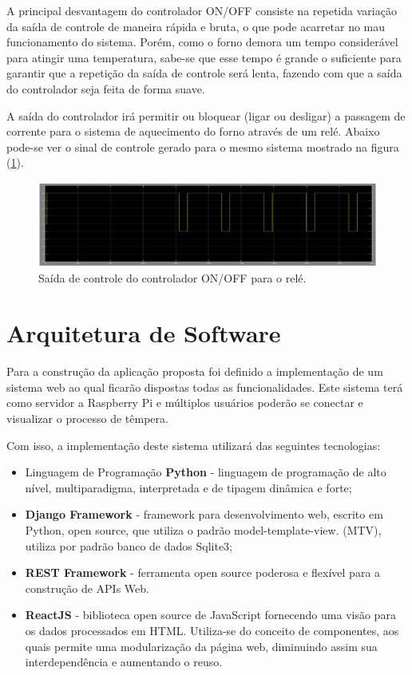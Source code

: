 A principal desvantagem do controlador ON/OFF consiste na repetida variação da saída de controle de maneira rápida e bruta, o que pode acarretar no mau funcionamento do sistema. Porém, como o forno demora um tempo considerável para atingir uma temperatura, sabe-se que esse tempo é grande o suficiente para garantir que a repetição da saída de controle será lenta, fazendo com que a saída do controlador seja feita de forma suave.

A saída do controlador irá permitir ou bloquear (ligar ou desligar) a passagem de corrente para o sistema de aquecimento do forno através de um relé. Abaixo pode-se ver o sinal de controle gerado para o mesmo sistema mostrado na figura (\ref{saida_controle}).

\begin{figure}[h]
	\centering
	\label{saida_controle}
	\includegraphics[keepaspectratio=true,scale=0.8]{figuras/saida_controle.JPG}
	\caption{Saída de controle do controlador ON/OFF para o relé.}
\end{figure}

\section{Arquitetura de Software}

Para a construção da aplicação proposta foi definido a implementação de um sistema web ao qual ficarão dispostas todas as funcionalidades. Este sistema terá como servidor a Raspberry Pi e múltiplos usuários poderão se conectar e visualizar o processo de têmpera.

Com isso, a implementação deste sistema utilizará das seguintes tecnologias:
\begin{itemize}
	\item Linguagem de Programação \textbf{Python} - linguagem de programação de alto nível, multiparadigma, interpretada e de tipagem dinâmica e forte;
	\item \textbf{Django Framework} - framework para desenvolvimento web, escrito em Python, open source, que utiliza o padrão model-template-view. (MTV), utiliza por padrão banco de dados Sqlite3;
	\item \textbf{REST Framework} -  ferramenta open source poderosa e flexível para a construção de APIs Web.
	\item \textbf{ReactJS} - biblioteca open source de JavaScript fornecendo uma visão para os dados processados em HTML. Utiliza-se do conceito de componentes, aos quais permite uma modularização da página web, diminuindo assim sua interdependência e aumentando o reuso.
	
\end{itemize}


